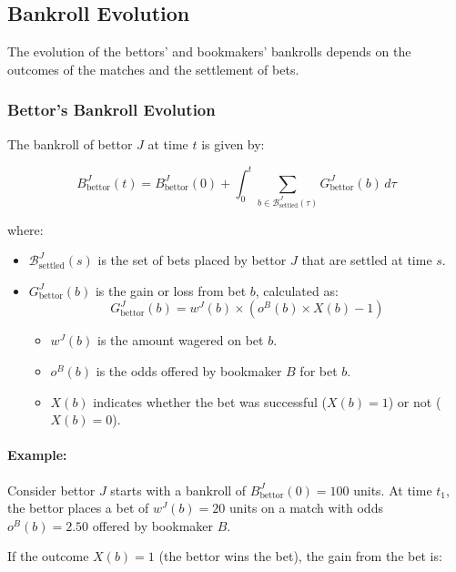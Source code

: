 \subsection{Bankroll Evolution}

The evolution of the bettors' and bookmakers' bankrolls depends on the outcomes of the matches and the settlement of bets.

\subsubsection{Bettor's Bankroll Evolution}

The bankroll of bettor \( J \) at time \( t \) is given by:

\[
B_{\text{bettor}}^J(t) = B_{\text{bettor}}^J(0) + \int_0^t \sum_{b \in \mathcal{B}_{\text{settled}}^J(\tau)} G_{\text{bettor}}^J(b) \, d\tau
\]

where:

\begin{itemize}
    \item \( \mathcal{B}_{\text{settled}}^{J}(s) \) is the set of bets placed by bettor \( J \) that are settled at time \( s \).
    \item \( G_{\text{bettor}}^J(b) \) is the gain or loss from bet \( b \), calculated as:
    \[
    G_{\text{bettor}}^J(b) = w^{J}(b) \times \left( o^{B}(b) \times X(b) - 1 \right)
    \]
    \begin{itemize}
        \item \( w^{J}(b) \) is the amount wagered on bet \( b \).
        \item \( o^{B}(b) \) is the odds offered by bookmaker \( B \) for bet \( b \).
        \item \( X(b) \) indicates whether the bet was successful (\( X(b) = 1 \)) or not (\( X(b) = 0 \)).
    \end{itemize}
\end{itemize}

\paragraph{Example:}

Consider bettor \( J \) starts with a bankroll of \( B_{\text{bettor}}^J(0) = 100 \) units. At time \( t_1 \), the bettor places a bet of \( w^{J}(b) = 20 \) units on a match with odds \( o^{B}(b) = 2.50 \) offered by bookmaker \( B \).

If the outcome \( X(b) = 1 \) (the bettor wins the bet), the gain from the bet is:

